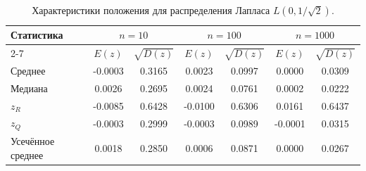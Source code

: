 \begin{table}[H]
\centering
\small
\begin{tabular}{|l|cc|cc|cc|}
\hline
\multirow{2}{*}{Статистика} & \multicolumn{2}{c|}{$n=10$} & \multicolumn{2}{c|}{$n=100$} & \multicolumn{2}{c|}{$n=1000$} \\
\cline{2-7}
 & $E(z)$ & $\sqrt{D(z)}$ & $E(z)$ & $\sqrt{D(z)}$ & $E(z)$ & $\sqrt{D(z)}$ \\
\hline
Среднее & -0.0003 & 0.3165 & 0.0023 & 0.0997 & 0.0000 & 0.0309 \\
\hline
Медиана & 0.0026 & 0.2695 & 0.0024 & 0.0761 & 0.0002 & 0.0222 \\
\hline
$z_R$ & -0.0085 & 0.6428 & -0.0100 & 0.6306 & 0.0161 & 0.6437 \\
\hline
$z_Q$ & -0.0003 & 0.2999 & -0.0003 & 0.0989 & -0.0001 & 0.0315 \\
\hline
Усечённое среднее & 0.0018 & 0.2850 & 0.0006 & 0.0871 & 0.0000 & 0.0267 \\
\hline
\end{tabular}
\caption{Характеристики положения для распределения Лапласа $L(0, 1/\sqrt{2})$.}
\label{tab:laplace_precise}
\end{table}